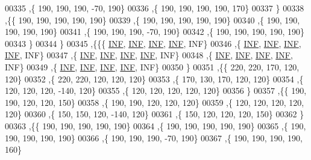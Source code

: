 \begin{DoxyCode}
00335   ,\{   190,   190,   190,   -70,   190\}
00336   ,\{   190,   190,   190,   190,   170\}
00337   \}
00338  ,\{\{   190,   190,   190,   190,   190\}
00339   ,\{   190,   190,   190,   190,   190\}
00340   ,\{   190,   190,   190,   190,   190\}
00341   ,\{   190,   190,   190,   -70,   190\}
00342   ,\{   190,   190,   190,   190,   190\}
00343   \}
00344  \}
00345 ,\{\{\{   \hyperlink{energy__const_8h_a12c2040f25d8e3a7b9e1c2024c618cb6}{INF},   \hyperlink{energy__const_8h_a12c2040f25d8e3a7b9e1c2024c618cb6}{INF},   \hyperlink{energy__const_8h_a12c2040f25d8e3a7b9e1c2024c618cb6}{INF},   \hyperlink{energy__const_8h_a12c2040f25d8e3a7b9e1c2024c618cb6}{INF},   INF\}
00346   ,\{   \hyperlink{energy__const_8h_a12c2040f25d8e3a7b9e1c2024c618cb6}{INF},   \hyperlink{energy__const_8h_a12c2040f25d8e3a7b9e1c2024c618cb6}{INF},   \hyperlink{energy__const_8h_a12c2040f25d8e3a7b9e1c2024c618cb6}{INF},   \hyperlink{energy__const_8h_a12c2040f25d8e3a7b9e1c2024c618cb6}{INF},   INF\}
00347   ,\{   \hyperlink{energy__const_8h_a12c2040f25d8e3a7b9e1c2024c618cb6}{INF},   \hyperlink{energy__const_8h_a12c2040f25d8e3a7b9e1c2024c618cb6}{INF},   \hyperlink{energy__const_8h_a12c2040f25d8e3a7b9e1c2024c618cb6}{INF},   \hyperlink{energy__const_8h_a12c2040f25d8e3a7b9e1c2024c618cb6}{INF},   INF\}
00348   ,\{   \hyperlink{energy__const_8h_a12c2040f25d8e3a7b9e1c2024c618cb6}{INF},   \hyperlink{energy__const_8h_a12c2040f25d8e3a7b9e1c2024c618cb6}{INF},   \hyperlink{energy__const_8h_a12c2040f25d8e3a7b9e1c2024c618cb6}{INF},   \hyperlink{energy__const_8h_a12c2040f25d8e3a7b9e1c2024c618cb6}{INF},   INF\}
00349   ,\{   \hyperlink{energy__const_8h_a12c2040f25d8e3a7b9e1c2024c618cb6}{INF},   \hyperlink{energy__const_8h_a12c2040f25d8e3a7b9e1c2024c618cb6}{INF},   \hyperlink{energy__const_8h_a12c2040f25d8e3a7b9e1c2024c618cb6}{INF},   \hyperlink{energy__const_8h_a12c2040f25d8e3a7b9e1c2024c618cb6}{INF},   INF\}
00350   \}
00351  ,\{\{   220,   220,   170,   120,   120\}
00352   ,\{   220,   220,   120,   120,   120\}
00353   ,\{   170,   130,   170,   120,   120\}
00354   ,\{   120,   120,   120,  -140,   120\}
00355   ,\{   120,   120,   120,   120,   120\}
00356   \}
00357  ,\{\{   190,   190,   120,   120,   150\}
00358   ,\{   190,   190,   120,   120,   120\}
00359   ,\{   120,   120,   120,   120,   120\}
00360   ,\{   150,   150,   120,  -140,   120\}
00361   ,\{   150,   120,   120,   120,   150\}
00362   \}
00363  ,\{\{   190,   190,   190,   190,   190\}
00364   ,\{   190,   190,   190,   190,   190\}
00365   ,\{   190,   190,   190,   190,   190\}
00366   ,\{   190,   190,   190,   -70,   190\}
00367   ,\{   190,   190,   190,   190,   160\}

\end{DoxyCode}
